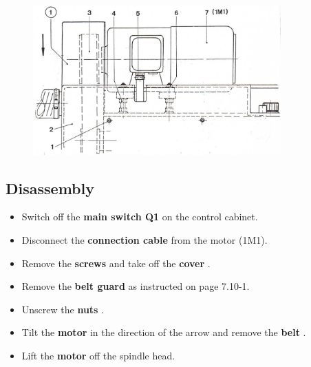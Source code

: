 

\begin{figure}[H]
    \centering
    \includegraphics[width=0.85\textwidth]{images/chapter9/main_motor_disassembly.jpg}
    \label{fig:main_motor_disassembly}
\end{figure}

\subsection*{Disassembly}

\begin{itemize}
    \setlength{\itemsep}{0pt} \setlength{\parskip}{0pt}
    \item Switch off the \textbf{main switch Q1} on the control cabinet.
    \item Disconnect the \textbf{connection cable } from the motor  (1M1).
    \item Remove the \textbf{screws } and take off the \textbf{cover }.
    \item Remove the \textbf{belt guard } as instructed on page 7.10-1.
    \item Unscrew the \textbf{nuts }.
\end{itemize}


\begin{itemize}
    \setlength{\itemsep}{0pt} \setlength{\parskip}{0pt}
    \item Tilt the \textbf{motor } in the direction of the arrow and remove the \textbf{belt }.
    \item Lift the \textbf{motor } off the spindle head.
\end{itemize}

